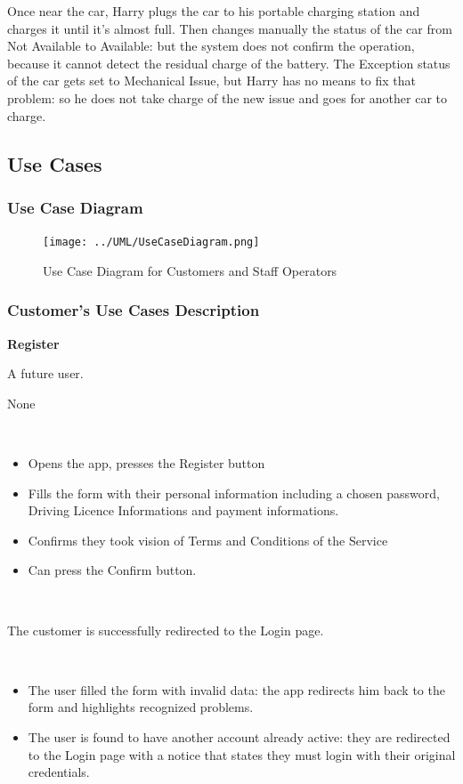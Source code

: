 \documentclass[11pt]{article} %
\begin{document}
Once near the car, Harry plugs the car to his portable charging station and charges it until it's almost full. Then changes manually the status of the car from Not Available to Available: but the system does not confirm the operation, because it cannot detect the residual charge of the battery. The Exception status of the car gets set to Mechanical Issue, but Harry has no means to fix that problem: so he does not take charge of the new issue and goes for another car to charge.


\subsection{Use Cases}

\subsubsection{Use Case Diagram}
\begin{figure}[H]
	\centering
	\texttt{[image: ../UML/UseCaseDiagram.png]}
	\caption{Use Case Diagram for Customers and Staff Operators}
\end{figure}

\subsubsection{Customer's Use Cases Description}

\begin{description}[noitemsep,topsep=0pt,parsep=0pt,partopsep=0pt]
	\item[Name:] \textbf{Register}
	\item[Actors Involved:] A future user.
	\item[Entry Conditions:] None
	\item[Flow Of Events:] \hfill\
	\begin{itemize}
		\item Opens the app, presses the Register button
		\item Fills the form with their personal information including a chosen password, Driving Licence Informations and payment informations.
		\item Confirms they took vision of Terms and Conditions of the Service 
		\item Can press the Confirm button.
	\end{itemize} \hfill\
	\item[Exit conditions:] The customer is successfully redirected to the Login page.
	\item[Exceptions:]  \hfill\
	\begin{itemize}
		\item The user filled the form with invalid data: the app redirects him back to the form and highlights recognized problems. 
		\item The user is found to have another account already active: they are redirected to the Login page with a notice that states they must login with their original credentials.
	\end{itemize}
\end{description}
\hfill\
\end{document}
